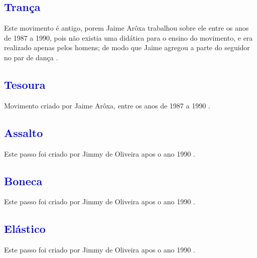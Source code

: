 \subsection{\textcolor{blue}{Trança}}
Este movimento é antigo, porem Jaime Arôxa trabalhou sobre ele entre os anos de 1987 a 1990,
pois não existia uma didática para o ensino do movimento, 
e era realizado apenas pelos homens; 
de modo que Jaime agregou a parte do seguidor no par de dança  \cite{EntrevistaJaimeAroxa1} \cite[pp. 143]{perna2002samba}.
\subsection{\textcolor{blue}{Tesoura}}
Movimento criado por Jaime Arôxa, entre os anos de 1987 a 1990 \cite{EntrevistaJaimeAroxa1} \cite[pp. 143]{perna2002samba}.


\subsection{\textcolor{blue}{Assalto}} 
Este passo foi criado por Jimmy de Oliveira apos o ano 1990 \cite{sambafunkeadoJimmyDeOliveiraPart1}.

\subsection{\textcolor{blue}{Boneca}} 
Este passo foi criado por Jimmy de Oliveira apos o ano 1990 \cite{sambafunkeadoJimmyDeOliveiraPart1}.

\subsection{\textcolor{blue}{Elástico}} 
Este passo foi criado por Jimmy de Oliveira apos o ano 1990 \cite{sambafunkeadoJimmyDeOliveiraPart1}.

